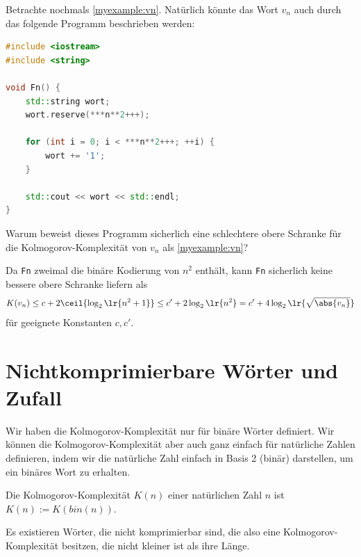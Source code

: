 \begin{myexercise}
	Betrachte nochmals \cref{myexample:vn}. Natürlich könnte das Wort $v_n$ auch durch das folgende Programm beschrieben werden:
	\begin{lstlisting}[language=C++,escapechar=!] 
#include <iostream>
#include <string>

void Fn() {
    std::string wort;
    wort.reserve(***n**2+++);

    for (int i = 0; i < ***n**2+++; ++i) {
        wort += '1';
    }

    std::cout << wort << std::endl;
}
    \end{lstlisting}
	Warum beweist dieses Programm sicherlich eine schlechtere obere Schranke für die Kolmogorov-Komplexität von $v_n$ als \cref{myexample:vn}?
	\begin{myanswer}
		Da \texttt{Fn} zweimal die binäre Kodierung von $n^2$ enthält, kann \texttt{Fn} sicherlich keine bessere obere Schranke liefern als
		\begin{align*}
			K(v_n)\leq c + 2\ceil{\log_2\lr{n^2 + 1}} \leq c' + 2\log_2\lr{n^2} = c' + 4\log_2\lr{\sqrt{\abs{v_n}}}
		\end{align*}
		für geeignete Konstanten $c, c'$.
	\end{myanswer}
\end{myexercise}

\section{Nichtkomprimierbare Wörter und Zufall}
Wir haben die Kolmogorov-Komplexität nur für binäre Wörter definiert. Wir können die Kolmogorov-Komplexität aber auch ganz einfach für natürliche Zahlen definieren, indem wir die natürliche Zahl einfach in Basis 2 (binär) darstellen, um ein binäres Wort zu erhalten.

\begin{mydefinition}
Die Kolmogorov-Komplexität $K(n)$ einer natürlichen Zahl $n$ ist $K(n) := K(bin(n))$.
\end{mydefinition}

Es existieren Wörter, die nicht komprimierbar sind, die also eine Kolmogorov-Komplexität besitzen, die nicht kleiner ist als ihre Länge.

